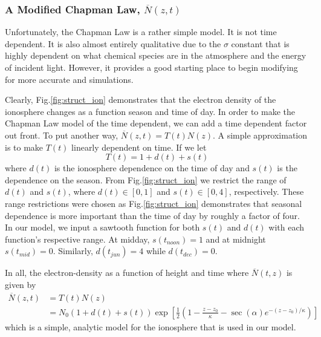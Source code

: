 \documentclass[11pt]{article}
\numberwithin{equation}{section}
\begin{document}
    
    \subsubsection{A Modified Chapman Law, $\overline N(z,t)$} %
    \label{ssub:modified_chapman_law}
    Unfortunately, the Chapman Law is a rather simple model. It is not time dependent. It is also almost entirely qualitative due to the $\sigma$ constant that is highly dependent on what chemical species are in the atmosphere and the energy of incident light. However, it provides a good starting place to begin modifying for more accurate and simulations.

    Clearly, Fig.\ref{fig:struct_ion} demonstrates that the electron density of the ionosphere changes as a function season and time of day. In order to make the Chapman Law model of the time dependent, we can add a time dependent factor out front. To put another way, $\overline N(z,t) = T(t) N(z)$. A simple approximation is to make $T(t)$ linearly dependent on time. If we let
    \begin{equation}
        T(t) = 1 + d(t) + s(t)
        \label{eq:time_dep}
    \end{equation}
    where $d(t)$ is the ionosphere dependence on the time of day and $s(t)$ is the dependence on the season. From Fig.\ref{fig:struct_ion} we restrict the range of $d(t)$ and $s(t)$, where $d(t) \in [0,1]$ and $s(t) \in [0,4]$, respectively. These range restrictions were chosen as Fig.\ref{fig:struct_ion} demonstrates that seasonal dependence is more important than the time of day by roughly a factor of four. In our model, we input a sawtooth function for both $s(t)$ and $d(t)$ with each function's respective range. At midday, $s(t_{noon}) = 1$ and at midnight $s(t_{mid}) = 0$. Similarly, $d(t_{jun}) = 4$ while $d(t_{dec}) = 0$.

    In all, the electron-density as a function of height and time where $\overline N(t,z)$ is given by 
    \begin{align}
        \overline N(z,t) &= T(t)N(z) \nonumber \\
        &= N_0(1 + d(t) + s(t))\exp\left[\frac12\left(1 - \frac{z-z_0}{\kappa} - \sec(\alpha) e^{- (z - z_0)/\kappa}\right)\right]
        \label{eq:final_eden}
    \end{align}
    which is a simple, analytic model for the ionosphere that is used in our model.
\end{document}
